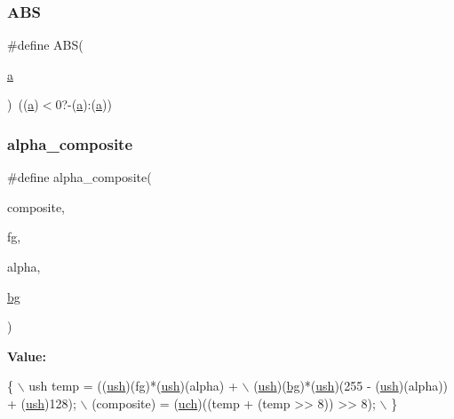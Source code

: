 \subsubsection{\texorpdfstring{A\+BS}{ABS}}
{\footnotesize\ttfamily \#define A\+BS(\begin{DoxyParamCaption}\item[{}]{\mbox{\hyperlink{isa-lr35902_8c_a7015284d2957ab7cdf82d2535a2fa547}{a}} }\end{DoxyParamCaption})~((\mbox{\hyperlink{isa-lr35902_8c_a7015284d2957ab7cdf82d2535a2fa547}{a}})$<$0?-\/(\mbox{\hyperlink{isa-lr35902_8c_a7015284d2957ab7cdf82d2535a2fa547}{a}})\+:(\mbox{\hyperlink{isa-lr35902_8c_a7015284d2957ab7cdf82d2535a2fa547}{a}}))}

\mbox{\label{rpng2-win_8c_af1fe887e7346a25e71f3b1527e723692}} 
\subsubsection{\texorpdfstring{alpha\+\_\+composite}{alpha\_composite}}
{\footnotesize\ttfamily \#define alpha\+\_\+composite(\begin{DoxyParamCaption}\item[{}]{composite,  }\item[{}]{fg,  }\item[{}]{alpha,  }\item[{}]{\mbox{\hyperlink{rpng2-x_8c_a808fa6d3573a86afa3ba7698a65b1ef6}{bg}} }\end{DoxyParamCaption})}

{\bfseries Value\+:}
\begin{DoxyCode}
\{               \(\backslash\)
    ush temp = ((\mbox{\hyperlink{readpng_8h_a3754180d606d4ed15468d15d9665aa2e}{ush}})(fg)*(\mbox{\hyperlink{readpng_8h_a3754180d606d4ed15468d15d9665aa2e}{ush}})(alpha) +                          \(\backslash\)
                (\mbox{\hyperlink{readpng_8h_a3754180d606d4ed15468d15d9665aa2e}{ush}})(\mbox{\hyperlink{rpng2-win_8c_a808fa6d3573a86afa3ba7698a65b1ef6}{bg}})*(\mbox{\hyperlink{readpng_8h_a3754180d606d4ed15468d15d9665aa2e}{ush}})(255 - (\mbox{\hyperlink{readpng_8h_a3754180d606d4ed15468d15d9665aa2e}{ush}})(alpha)) + (\mbox{\hyperlink{readpng_8h_a3754180d606d4ed15468d15d9665aa2e}{ush}})128);  \(\backslash\)
    (composite) = (\mbox{\hyperlink{readpng_8h_af3307af5922c72924a837559c801a8a4}{uch}})((temp + (temp >> 8)) >> 8);               \(\backslash\)
\}
\end{DoxyCode}
\mbox{\label{rpng2-win_8c_a747f7929e94899e6b0714649864b8711}} 
